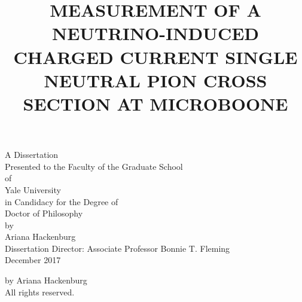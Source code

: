 \documentclass[12pt]{article}
\begin{document}
\singlespacing
\title{MEASUREMENT OF A NEUTRINO-INDUCED CHARGED CURRENT SINGLE NEUTRAL PION CROSS SECTION AT MICROBOONE}
\date{}
\maketitle

\vspace{4 cm}

\begin{center}
A Dissertation \\
Presented to the Faculty of the Graduate School \\
of \\
Yale University \\
in Candidacy for the Degree of \\
Doctor of Philosophy\\ 

\vspace{6 cm}
by \\
Ariana Hackenburg \\
\vspace{3 mm}
Dissertation Director: Associate Professor Bonnie T. Fleming \\
\vspace{3 mm}
December 2017 \\ %
\end{center}
\thispagestyle{empty}


\clearpage

\vspace*{\fill}
\begin{center}
 by Ariana Hackenburg\\
All rights reserved.
\end{center}
\vspace*{\fill}

\clearpage

\doublespacing

\pagestyle{fancy}%
\fancyhead[C]{}
\renewcommand{\headrulewidth}{0.4pt}%
\end{document}
